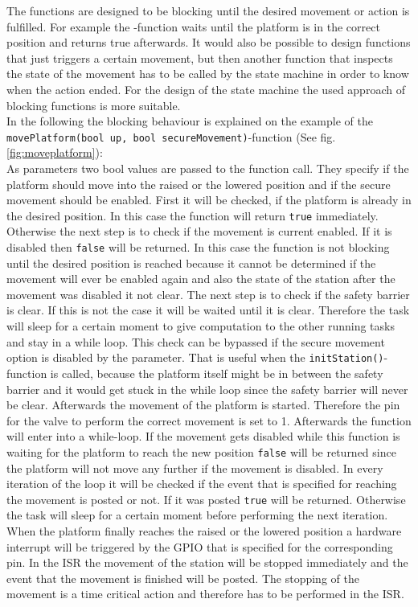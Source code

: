 The functions are designed to be blocking until the desired movement or action is fulfilled. For example the -function waits until the platform is in the correct position and returns true afterwards. It would also be possible to design functions that just triggers a certain movement, but then another function that inspects the state of the movement has to be called by the state machine in order to know when the action ended. For the design of the state machine the used approach of blocking functions is more suitable. \\

In the following the blocking behaviour is explained on the example of the \texttt{movePlatform(bool up, bool secureMovement)}-function (See fig. \ref{fig:moveplatform}): \\
As parameters two bool values are passed to the function call. They specify if the platform should move into the raised or the lowered position and if the secure movement should be enabled. 
First it will be checked, if the platform is already in the desired position. In this case the function will return \texttt{true} immediately. Otherwise the next step is to check if the movement is current enabled. If it is disabled then \texttt{false} will be returned. In this case the function is not blocking until the desired position is reached because it cannot be determined if the movement will ever be enabled again and also the state of the station after the movement was disabled it not clear.
The next step is to check if the safety barrier is clear. If this is not the case it will be waited until it is clear. Therefore the task will sleep for a certain moment to give computation to the other running tasks and stay in a while loop. This check can be bypassed if the secure movement option is disabled by the parameter. That is useful when the \texttt{initStation()}-function is called, because the platform itself might be in between the safety barrier and it would get stuck in the while loop since the safety barrier will never be clear.
Afterwards the movement of the platform is started. Therefore the pin for the valve to perform the correct movement is set to 1. 
Afterwards the function will enter into a while-loop. If the movement gets disabled while this function is waiting for the platform to reach the new position \texttt{false} will be returned since the platform will not move any further if the movement is disabled. In every iteration of the loop it will be checked if the event that is specified for reaching the movement is posted or not. If it was posted \texttt{true} will be returned. Otherwise the task will sleep for a certain moment before performing the next iteration.\\
When the platform finally reaches the raised or the lowered position a hardware interrupt will be triggered by the GPIO that is specified for the corresponding pin. In the ISR the movement of the station will be stopped immediately and the event that the movement is finished will be posted. The stopping of the movement is a time critical action and therefore has to be performed in the ISR. 


